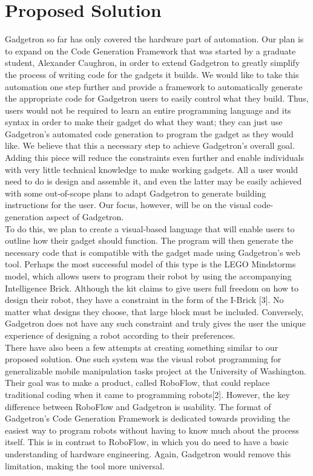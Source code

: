 \documentclass[12pt]{article}
\begin{document}
\section{Proposed Solution}
Gadgetron so far has only covered the hardware part of automation. Our plan is to expand on the Code Generation Framework that was started by a graduate student, Alexander Caughron, in order to extend Gadgetron to greatly simplify the process of writing code for the gadgets it builds. We would like to take this automation one step further and provide a framework to automatically generate the appropriate code for Gadgetron users to easily control what they build. Thus, users would not be required to learn an entire programming language and its syntax in order to make their gadget do what they want; they can just use Gadgetron's automated code generation to program the gadget as they would like. We believe that this a necessary step to achieve Gadgetron's overall goal. Adding this piece will reduce the constraints even further and enable individuals with very little technical knowledge to make working gadgets. All a user would need to do is design and assemble it, and even the latter may be easily achieved with some out-of-scope plans to adapt Gadgetron to generate building instructions for the user. Our focus, however, will be on the visual code-generation aspect of Gadgetron.\\[7pt]

To do this, we plan to create a visual-based language that will enable users to outline how their gadget should function. The program will then generate the necessary code that is compatible with the gadget made using Gadgetron's web tool. Perhaps the most successful model of this type is the LEGO Mindstorms model, which allows users to program their robot by using the accompanying Intelligence Brick. Although the kit claims to give users full freedom on how to design their robot, they have a constraint in the form of the I-Brick [3]. No matter what designs they choose, that large block must be included. Conversely, Gadgetron does not have any such constraint and truly gives the user the unique experience of designing a robot according to their preferences.\\[7pt]

There have also been a few attempts at creating something similar to our proposed solution. One such system was the visual robot programming for generalizable mobile manipulation tasks project at the University of Washington. Their goal was to make a product, called RoboFlow, that could replace traditional coding when it came to programming robots[2]. However, the key difference between RoboFlow and Gadgetron is usability. The format of Gadgetron's Code Generation Framework is dedicated towards providing the easiest way to program robots without having to know much about the process itself. This is in contrast to RoboFlow, in which you do need to have a basic understanding of hardware engineering. Again, Gadgetron would remove this limitation, making the tool more universal.\\[7pt]
\end{document}
